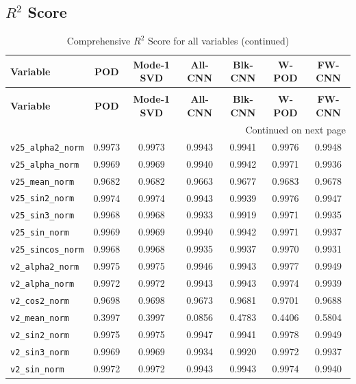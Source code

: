 \documentclass{article}
\begin{document}
\subsection{$R^2$ Score}
\begin{longtable}{l cccccc}
\caption{Comprehensive $R^2$ Score for all variables.}\\
\toprule
\textbf{Variable} & \textbf{POD} & \textbf{Mode-1 SVD} & \textbf{All-CNN} & \textbf{Blk-CNN} & \textbf{W-POD} & \textbf{FW-CNN} \\
\midrule
\endfirsthead
\caption[]{Comprehensive $R^2$ Score for all variables (continued)}\\
\toprule
\textbf{Variable} & \textbf{POD} & \textbf{Mode-1 SVD} & \textbf{All-CNN} & \textbf{Blk-CNN} & \textbf{W-POD} & \textbf{FW-CNN} \\
\midrule
\endhead
\midrule
\multicolumn{7}{r}{{Continued on next page}} \\
\bottomrule
\endfoot
\bottomrule
\endlastfoot
\texttt{v25\_alpha2\_norm} & 0.9973 & 0.9973 & 0.9943 & 0.9941 & 0.9976 & 0.9948 \\
\texttt{v25\_alpha\_norm} & 0.9969 & 0.9969 & 0.9940 & 0.9942 & 0.9971 & 0.9936 \\
\texttt{v25\_mean\_norm} & 0.9682 & 0.9682 & 0.9663 & 0.9677 & 0.9683 & 0.9678 \\
\texttt{v25\_sin2\_norm} & 0.9974 & 0.9974 & 0.9943 & 0.9939 & 0.9976 & 0.9947 \\
\texttt{v25\_sin3\_norm} & 0.9968 & 0.9968 & 0.9933 & 0.9919 & 0.9971 & 0.9935 \\
\texttt{v25\_sin\_norm} & 0.9969 & 0.9969 & 0.9940 & 0.9942 & 0.9971 & 0.9937 \\
\texttt{v25\_sincos\_norm} & 0.9968 & 0.9968 & 0.9935 & 0.9937 & 0.9970 & 0.9931 \\
\texttt{v2\_alpha2\_norm} & 0.9975 & 0.9975 & 0.9946 & 0.9943 & 0.9977 & 0.9949 \\
\texttt{v2\_alpha\_norm} & 0.9972 & 0.9972 & 0.9943 & 0.9943 & 0.9974 & 0.9939 \\
\texttt{v2\_cos2\_norm} & 0.9698 & 0.9698 & 0.9673 & 0.9681 & 0.9701 & 0.9688 \\
\texttt{v2\_mean\_norm} & 0.3997 & 0.3997 & 0.0856 & 0.4783 & 0.4406 & 0.5804 \\
\texttt{v2\_sin2\_norm} & 0.9975 & 0.9975 & 0.9947 & 0.9941 & 0.9978 & 0.9949 \\
\texttt{v2\_sin3\_norm} & 0.9969 & 0.9969 & 0.9934 & 0.9920 & 0.9972 & 0.9937 \\
\texttt{v2\_sin\_norm} & 0.9972 & 0.9972 & 0.9943 & 0.9943 & 0.9974 & 0.9940 \\

\end{longtable}
\end{document}
